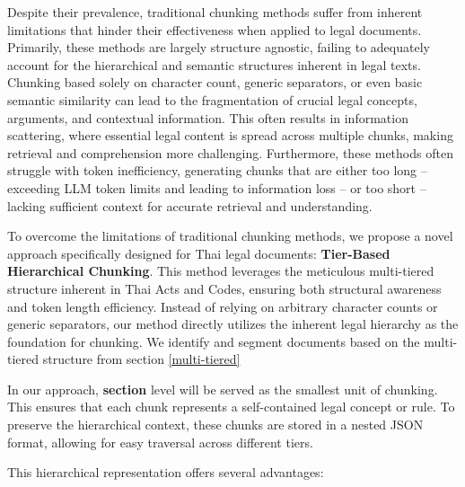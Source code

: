 Despite their prevalence, traditional chunking methods suffer from inherent limitations that hinder their effectiveness when applied to legal documents. Primarily, these methods are largely structure agnostic, failing to adequately account for the hierarchical and semantic structures inherent in legal texts. Chunking based solely on character count, generic separators, or even basic semantic similarity can lead to the fragmentation of crucial legal concepts, arguments, and contextual information. This often results in information scattering, where essential legal content is spread across multiple chunks, making retrieval and comprehension more challenging. Furthermore, these methods often struggle with token inefficiency, generating chunks that are either too long – exceeding LLM token limits and leading to information loss – or too short – lacking sufficient context for accurate retrieval and understanding.

To overcome the limitations of traditional chunking methods, we propose a novel approach specifically designed for Thai legal documents: \textbf{Tier-Based Hierarchical Chunking}. This method leverages the meticulous multi-tiered structure inherent in Thai Acts and Codes, ensuring both structural awareness and token length efficiency. Instead of relying on arbitrary character counts or generic separators, our method directly utilizes the inherent legal hierarchy as the foundation for chunking. We identify and segment documents based on the multi-tiered structure from section \ref{multi-tiered}

In our approach, \textbf{section} level will be served as the smallest unit of chunking. This ensures that each chunk represents a self-contained legal concept or rule. To preserve the hierarchical context, these chunks are stored in a nested JSON format, allowing for easy traversal across different tiers.

This hierarchical representation offers several advantages:


